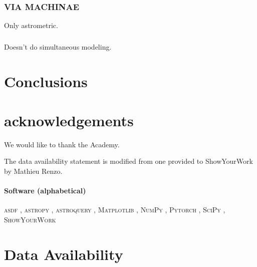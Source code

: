 \documentclass[twocolumn]{aastex631}
\newcommand{\package}[1]{\textsc{#1}}
\begin{document}
    
        \subsubsection{VIA MACHINAE}{\cite{2022MNRAS.509.5992S}}

            Only astrometric.
    
    
        \subsubsection[Uniform Modeling of 13 Stellar Streams]{\cite{PatrickEtAl2022}}

            Doesn't do simultaneous modeling.
    


\section{Conclusions} \label{sec:conclusions}




\section{acknowledgements}

    We would like to thank the Academy.

    The data availability statement is modified from one provided to ShowYourWork by Mathieu Renzo.

    \paragraph{Software (alphabetical)}

        \package{asdf} \citep{Greenfield2015},
        \package{astropy} \citep{Astropy2013, Astropy2018, Astropy2022},
        \package{astroquery} \citep{Astroquery2019},
        \package{Matplotlib} \citep{Hunter2007},
        \package{NumPy} \citep{Harris2020},
        \package{Pytorch} \citep{Pytorch2019},
        \package{SciPy} \citep{Scipy2020},
        \package{ShowYourWork} \citep{}


\section*{Data Availability} \label{sec:data_availability}
\end{document}

